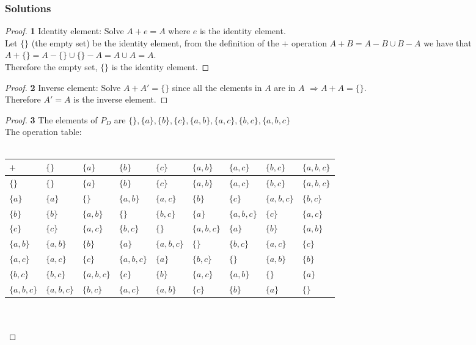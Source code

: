 \documentclass[11pt]{article}
\begin{document}
	\subsubsection*{Solutions}
		\begin{proof}{\textbf{1}}
			Identity element: Solve $A+e = A$ where $e$ is the identity element.\\
			Let $\{\}$ (the empty set) be the identity element, from the definition of the $+$ operation $A+B = A-B \cup B-A$ we have that\\
			$A+\{\} = A - \{\} \cup \{\} - A = A \cup A = A$.\\
			Therefore the empty set, $\{\}$ is the identity element.  		
		\end{proof}
		\begin{proof}{\textbf{2}}
			Inverse element: Solve $A+A'=\{\}$ since all the elements in $A$ are in $A$ $\Rightarrow A+A = \{\}$.\\
			Therefore $A' = A$ is the inverse element.
		\end{proof}
		\begin{proof}{\textbf{3}}
			The elements of $P_D$ are $\{\}, \{a\}, \{b\}, \{c\}, \{a,b\}, \{a,c\}, \{b,c\}, \{a,b,c\}$\\
			The operation table:\\
			\\
			\begin{adjustbox}{max width=\textwidth,center}
			\begin{tabular}{l|llllllll}
				$+$ & $\{\}$ & $\{a\}$ & $\{b\}$ & $\{c\}$ & $\{a,b\}$ & $\{a,c\}$ & $\{b,c\}$ & $\{a,b,c\}$ \\ \hline
				$\{\}$ & $\{\}$ & $\{a\}$ & $\{b\}$ & $\{c\}$ & $\{a,b\}$ & $\{a,c\}$ & $\{b,c\}$ & $\{a,b,c\}$ \\ 
				$\{a\}$ & $\{a\}$ & $\{\}$ & $\{a,b\}$ & $\{a,c\}$ & $\{b\}$ & $\{c\}$ & $\{a,b,c\}$ & $\{b,c\}$ \\
				$\{b\}$ & $\{b\}$ & $\{a,b\}$ & $\{\}$ & $\{b,c\}$ & $\{a\}$ & $\{a,b,c\}$ & $\{c\}$ & $\{a,c\}$ \\
				$\{c\}$ & $\{c\}$ & $\{a,c\}$ & $\{b,c\}$ & $\{\}$ & $\{a,b,c\}$ & $\{a\}$ & $\{b\}$ & $\{a,b\}$ \\
				$\{a,b\}$ & $\{a,b\}$ & $\{b\}$ & $\{a\}$ & $\{a,b,c\}$ & $\{\}$ & $\{b,c\}$ & $\{a,c\}$ & $\{c\}$ \\
				$\{a,c\}$ & $\{a,c\}$ & $\{c\}$ & $\{a,b,c\}$ & $\{a\}$ & $\{b,c\}$ & $\{\}$ & $\{a,b\}$ & $\{b\}$ \\
				$\{b,c\}$ & $\{b,c\}$ & $\{a,b,c\}$ & $\{c\}$ & $\{b\}$ & $\{a,c\}$ & $\{a,b\}$ & $\{\}$ & $\{a\}$ \\
				$\{a,b,c\}$ & $\{a,b,c\}$ & $\{b,c\}$ & $\{a,c\}$ & $\{a,b\}$ & $\{c\}$ & $\{b\}$ & $\{a\}$ & $\{\}$ \\
			\end{tabular}
			\end{adjustbox}
			\\\\
		\end{proof}
	
	
	
\end{document}
